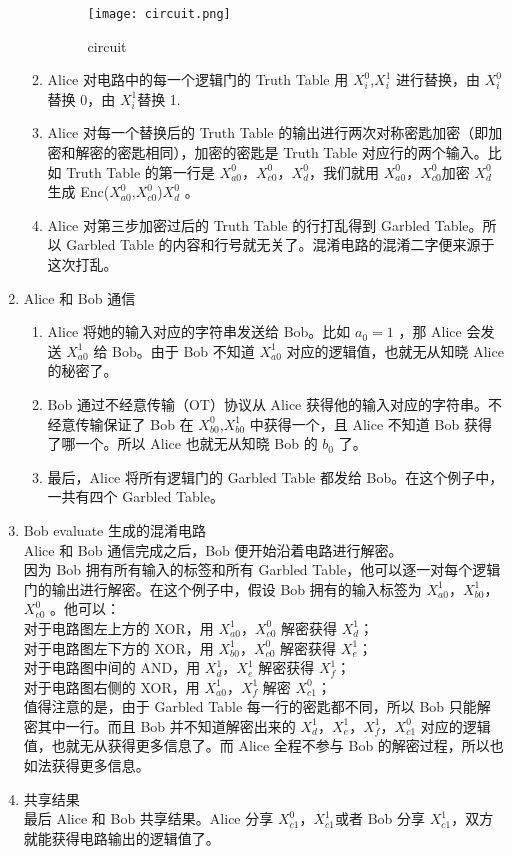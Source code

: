 \begin{enumerate}
\begin{enumerate}
\begin{figure}[h]
    \centering
    \texttt{[image: circuit.png]}
    \caption{circuit}
    \label{fig:circuit}
\end{figure}
\item Alice 对电路中的每一个逻辑门的 Truth Table 用 $X^0_{i}$,$X^1_{i}$
进行替换，由 $X^0_{i}$替换 0，由 $X^1_{i}$替换 1.
 \item Alice 对每一个替换后的 Truth Table 的输出进行两次对称密匙加密（即加密和解密的密匙相同），加密的密匙是 Truth Table 对应行的两个输入。比如 Truth Table 的第一行是 $X^0_{a0}$，$X^0_{c0}$，$X^0_{d}$，我们就用 $X^0_{a0}$，$X^0_{c0}$加密 $X^0_{d}$生成 Enc($X^0_{a0}$,$X^0_{c0}$){$X^0_{d}$}
 。
\item Alice 对第三步加密过后的 Truth Table 的行打乱得到 Garbled Table。所以 Garbled Table 的内容和行号就无关了。混淆电路的混淆二字便来源于这次打乱。
\end{enumerate}
\item Alice 和 Bob 通信
\begin{enumerate}
\item Alice 将她的输入对应的字符串发送给 Bob。比如 $a_0=1$
 ，那 Alice 会发送 $X_{a0}^1$
 给 Bob。由于 Bob 不知道 $X_{a0}^1$
对应的逻辑值，也就无从知晓 Alice 的秘密了。
\item Bob 通过不经意传输（OT）协议从 Alice 获得他的输入对应的字符串。不经意传输保证了 Bob 在 {$X^0_{b0}$,$X^1_{b0}$}
 中获得一个，且 Alice 不知道 Bob 获得了哪一个。所以 Alice 也就无从知晓 Bob 的 $b_0$
 了。
\item 最后，Alice 将所有逻辑门的 Garbled Table 都发给 Bob。在这个例子中，一共有四个 Garbled Table。
\end{enumerate}
\item Bob evaluate 生成的混淆电路\\
Alice 和 Bob 通信完成之后，Bob 便开始沿着电路进行解密。\\
因为 Bob 拥有所有输入的标签和所有 Garbled Table，他可以逐一对每个逻辑门的输出进行解密。在这个例子中，假设 Bob 拥有的输入标签为 $X^1_{a0}$，$X^1_{b0}$，$X^0_{c0}$
 。他可以：\\
对于电路图左上方的 XOR，用 $X^1_{a0}$，$X^0_{c0}$
 解密获得 $X^1_{d}$；\\
对于电路图左下方的 XOR，用 $X^1_{b0}$，$X^0_{c0}$
 解密获得 $X^1_{e}$；\\
对于电路图中间的 AND，用 $X^1_{d}$，$X^1_{e}$
 解密获得 $X^1_{f}$；\\
对于电路图右侧的 XOR，用 $X^1_{a0}$，$X^1_{f}$
 解密 $X^0_{c1}$；\\
值得注意的是，由于 Garbled Table 每一行的密匙都不同，所以 Bob 只能解密其中一行。而且 Bob 并不知道解密出来的 $X^1_{d}$，$X^1_{e}$，$X^1_{f}$，$X^0_{c1}$
 对应的逻辑值，也就无从获得更多信息了。而 Alice 全程不参与 Bob 的解密过程，所以也如法获得更多信息。\\
 
\item 共享结果\\
 最后 Alice 和 Bob 共享结果。Alice 分享 $X^0_{c1}$，$X^1_{c1}$或者 Bob 分享 $X^1_{c1}$，双方就能获得电路输出的逻辑值了。\\

 \end{enumerate}
 
